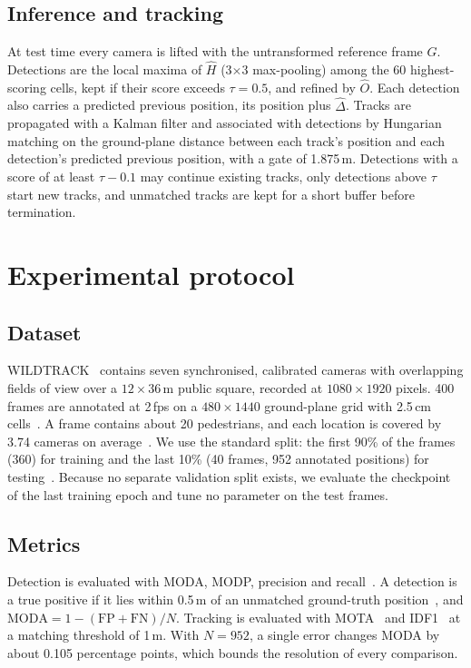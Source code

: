 \documentclass[10pt,twocolumn,letterpaper]{article}
\newcommand{\Hhat}{\hat{H}}
\newcommand{\Ohat}{\hat{O}}
\newcommand{\Dhat}{\hat{\Delta}}
\begin{document}
\subsection{Inference and tracking}
\label{sec:inference}

At test time every camera is lifted with the untransformed reference frame $G$. Detections are the local maxima of
$\Hhat$ (3$\times$3 max-pooling) among the 60 highest-scoring cells, kept if their score exceeds $\tau = 0.5$, and
refined by $\Ohat$. Each detection also carries a predicted previous position, its position plus $\Dhat$. Tracks are
propagated with a Kalman filter and associated with detections by Hungarian matching on the ground-plane distance
between each track's position and each detection's predicted previous position, with a gate of 1.875\,m. Detections
with a score of at least $\tau - 0.1$ may continue existing tracks, only detections above $\tau$ start new tracks,
and unmatched tracks are kept for a short buffer before termination.

\section{Experimental protocol}
\label{sec:protocol}

\subsection{Dataset}
WILDTRACK~\cite{chavdarova2017wildtrack} contains seven synchronised, calibrated cameras with overlapping fields of
view over a $12 \times 36$\,m public square, recorded at $1080 \times 1920$ pixels. 400 frames are annotated at
2\,fps on a $480 \times 1440$ ground-plane grid with 2.5\,cm cells~\cite{teepe2024lifting}. A frame contains about
20 pedestrians, and each location is covered by 3.74 cameras on average~\cite{hou2020mvdet}. We use the standard
split: the first 90\% of the frames (360) for training and the last 10\% (40 frames, 952 annotated positions) for
testing~\cite{hou2020mvdet}. Because no separate validation split exists, we evaluate the checkpoint of the last
training epoch and tune no parameter on the test frames.

\subsection{Metrics}
Detection is evaluated with MODA, MODP, precision and recall~\cite{chavdarova2017wildtrack,hou2020mvdet}. A
detection is a true positive if it lies within 0.5\,m of an unmatched ground-truth position~\cite{teepe2024lifting},
and $\mathrm{MODA} = 1 - (\mathrm{FP} + \mathrm{FN}) / N$. Tracking is evaluated with MOTA~\cite{bernardin2008clear}
and IDF1~\cite{ristani2016performance} at a matching threshold of 1\,m. With $N = 952$, a single error changes MODA
by about 0.105 percentage points, which bounds the resolution of every comparison.
\end{document}
